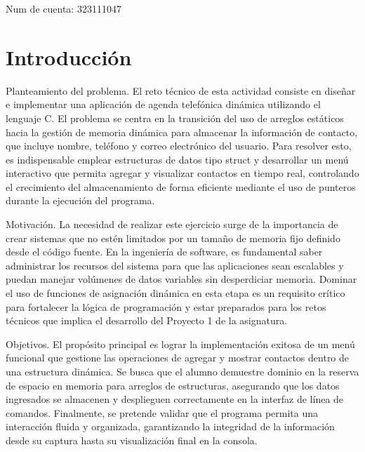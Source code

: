 Num de cuenta: 323111047

\section{Introducción}

Planteamiento del problema. El reto técnico de esta actividad consiste en diseñar e implementar una aplicación de agenda telefónica dinámica utilizando el lenguaje C. El problema se centra en la transición del uso de arreglos estáticos hacia la gestión de memoria dinámica para almacenar la información de contacto, que incluye nombre, teléfono y correo electrónico del usuario. Para resolver esto, es indispensable emplear estructuras de datos tipo struct y desarrollar un menú interactivo que permita agregar y visualizar contactos en tiempo real, controlando el crecimiento del almacenamiento de forma eficiente mediante el uso de punteros durante la ejecución del programa.

\vspace{0.4cm}

Motivación. La necesidad de realizar este ejercicio surge de la importancia de crear sistemas que no estén limitados por un tamaño de memoria fijo definido desde el código fuente. En la ingeniería de software, es fundamental saber administrar los recursos del sistema para que las aplicaciones sean escalables y puedan manejar volúmenes de datos variables sin desperdiciar memoria. Dominar el uso de funciones de asignación dinámica en esta etapa es un requisito crítico para fortalecer la lógica de programación y estar preparados para los retos técnicos que implica el desarrollo del Proyecto 1 de la asignatura.

\vspace{0.4cm}


Objetivos. El propósito principal es lograr la implementación exitosa de un menú funcional que gestione las operaciones de agregar y mostrar contactos dentro de una estructura dinámica. Se busca que el alumno demuestre dominio en la reserva de espacio en memoria para arreglos de estructuras, asegurando que los datos ingresados se almacenen y desplieguen correctamente en la interfaz de línea de comandos. Finalmente, se pretende validar que el programa permita una interacción fluida y organizada, garantizando la integridad de la información desde su captura hasta su visualización final en la consola.
